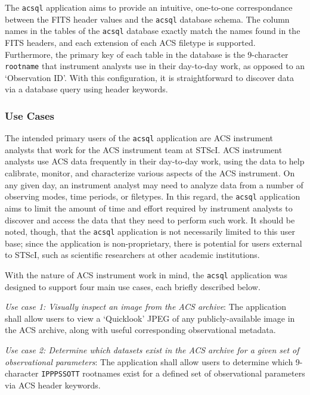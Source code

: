 \documentclass[10pt,journal,compsoc]{IEEEtran}
\begin{document}
The \texttt{acsql} application aims to provide an intuitive, one-to-one correspondance between the FITS header values and the \texttt{acsql} database schema.  The column names in the
tables of the \texttt{acsql} database exactly match the names found in the FITS headers, and each extension of each ACS filetype is supported.  Furthermore, the primary key of each
table in the database is the 9-character \texttt{rootname} that instrument analysts use in their day-to-day work, as opposed to an `Observation ID'.  With this configuration, it
is straightforward to discover data via a database query using header keywords.


\subsubsection{Use Cases} \label{sec1.3.5}

The intended primary users of the \texttt{acsql} application are ACS instrument analysts that work for the ACS instrument team at STScI.  ACS instrument analysts use ACS data frequently
in their day-to-day work, using the data to help calibrate, monitor, and characterize various aspects of the ACS instrument.  On any given day, an instrument analyst may need to analyze
data from a number of observing modes, time periods, or filetypes.  In this regard, the \texttt{acsql} application aims to limit the amount of time and effort required by instrument
analysts to discover and access the data that they need to perform such work. It should be noted, though, that the \texttt{acsql} application is not necessarily limited to this user base;
since the application is non-proprietary, there is potential for users external to STScI, such as scientific researchers at other academic institutions.

With the nature of ACS instrument work in mind, the \texttt{acsql} application was designed to support four main use cases, each briefly described below.

\textit{Use case 1: Visually inspect an image from the ACS archive}:  The application shall allow users to view a `Quicklook' JPEG of any publicly-available image in the ACS archive,
along with useful corresponding observational metadata.

\textit{Use case 2: Determine which datasets exist in the ACS archive for a given set of observational parameters}:  The application shall allow users to determine which
9-character \texttt{IPPPSSOTT} rootnames exist for a defined set of observational parameters via ACS header keywords.
\end{document}
